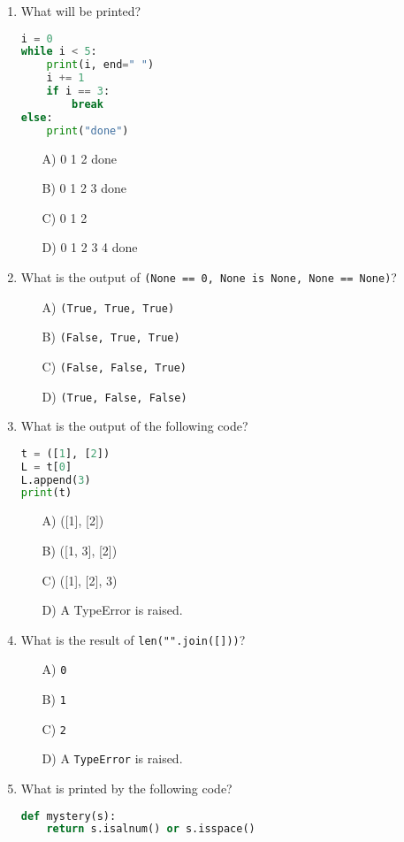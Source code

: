\documentclass[9pt]{article}
\begin{document}
\begin{multicols}{2}
\begin{enumerate}
\item What will be printed?
\begin{lstlisting}[language=Python]
i = 0
while i < 5:
    print(i, end=" ")
    i += 1
    if i == 3:
        break
else:
    print("done")
\end{lstlisting}
\begin{enumerate}
\item[A)] 0 1 2 done
\item[B)] 0 1 2 3 done
\item[C)] 0 1 2
\item[D)] 0 1 2 3 4 done
\end{enumerate}

\item What is the output of \texttt{(None == 0, None is None, None == None)}?
\begin{enumerate}
    \item[A)] \texttt{(True, True, True)}
    \item[B)] \texttt{(False, True, True)}
    \item[C)] \texttt{(False, False, True)}
    \item[D)] \texttt{(True, False, False)}
\end{enumerate}

\item What is the output of the following code?
\begin{lstlisting}[language=Python]
t = ([1], [2])
L = t[0]
L.append(3)
print(t)
\end{lstlisting}
\begin{enumerate}
\item[A)] ([1], [2])
\item[B)] ([1, 3], [2])
\item[C)] ([1], [2], 3)
\item[D)] A TypeError is raised.
\end{enumerate}

\item What is the result of \texttt{len("".join([]))}?
\begin{enumerate}
    \item[A)] \texttt{0}
    \item[B)] \texttt{1}
    \item[C)] \texttt{2}
    \item[D)] A \texttt{TypeError} is raised.
\end{enumerate}

\item What is printed by the following code?
\begin{lstlisting}[language=Python]
def mystery(s):
    return s.isalnum() or s.isspace()


\end{lstlisting}
\end{enumerate}
\end{multicols}
\end{document}
